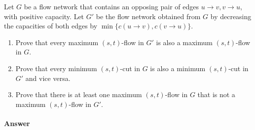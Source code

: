 \documentclass{article}
\begin{document}
Let $G$ be a flow network that contains an opposing pair of edges $u \to v, v \to u$, with positive capacity.
Let $G'$ be the flow network obtained from $G$ by decreasing the capacities of both edges by $\min \{ c(u \to v), c(v \to u) \}$.
\begin{enumerate}[label=(\alph*)]
    \item Prove that every maximum $(s,t)$-flow in $G'$ is also a maximum $(s,t)$-flow in $G$.
    \item Prove that every minimum $(s,t)$-cut in $G$ is also a minimum $(s,t)$-cut in $G'$ and vice versa.
    \item Prove that there is at least one maximum $(s,t)$-flow in $G$ that is not a maximum $(s,t)$-flow in $G'$.
\end{enumerate}

\paragraph{Answer}

\end{document}
